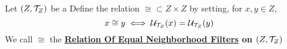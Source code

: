 \label{def:RelationOfEqualNeighborhoodFilters}
\newcommand{\RelationOfEqualNeighborhoodFilters}[1]{
    \bf \hyperref[def:RelationOfEqualNeighborhoodFilters]{Relation Of Equal Neighborhood Filters} \rm on #1
}
\begin{df}
    Let $(Z, \mathcal{T}_Z)$ be a \TopologicalSpace
	Define the relation 
	$\cong \subset Z \times Z$ 
	by setting, for $x,y \in Z$, 
    \begin{equation}
        x \cong y \iff \mathcal{U}_{\mathcal{T}_Z}(x)=\mathcal{U}_{\mathcal{T}_Z}(y)
    \end{equation}
    We call $\cong$ the \RelationOfEqualNeighborhoodFilters{$(Z,\mathcal{T}_Z)$}
\end{df} 